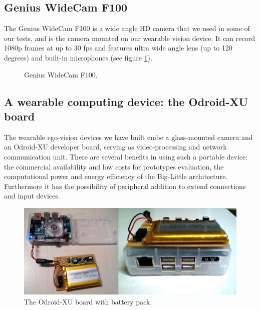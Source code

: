 \subsection{Genius WideCam F100}
The Genius WideCam F100 is a wide angle HD camera that we used in some of our tests, and is the camera mounted on our wearable vision device. It can record 1080p frames at up to 30 fps and features ultra wide angle lens (up to 120 degrees) and built-in microphones (see figure \ref{fig:wide-camera}).

\begin{figure}[tb]
\centering
{}
\caption{Genius WideCam F100.}
\label{fig:wide-camera}
\end{figure}

\subsection{A wearable computing device: the Odroid-XU board}
\label{odroid-intro}


The wearable ego-vision devices we have built embe a glass-mounted camera and an Odroid-XU developer board, serving as video-processing and network communication unit.
There are several benefits in using such a portable device: the commercial availability and low costs for prototypes evaluation, the computational power and energy efficiency of the Big-Little architecture. Furthermore it has the possibility  of peripheral addition to extend connections and input devices. 

\begin{figure}[t!]
\centering
\includegraphics[width=0.6\linewidth]{Figures/board.jpg}
\caption{The Odroid-XU board with battery pack.}
\label{board}
\end{figure}

